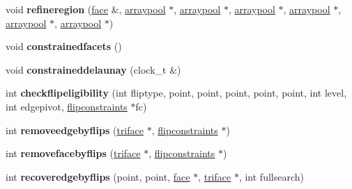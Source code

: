 \begin{DoxyCompactItemize}
\item 
\mbox{\label{classtetgenmesh_aa34a5188a4cee82197394560c388c348}} 
void {\bfseries refineregion} (\hyperlink{classtetgenmesh_1_1face}{face} \&, \hyperlink{classtetgenmesh_1_1arraypool}{arraypool} $\ast$, \hyperlink{classtetgenmesh_1_1arraypool}{arraypool} $\ast$, \hyperlink{classtetgenmesh_1_1arraypool}{arraypool} $\ast$, \hyperlink{classtetgenmesh_1_1arraypool}{arraypool} $\ast$, \hyperlink{classtetgenmesh_1_1arraypool}{arraypool} $\ast$, \hyperlink{classtetgenmesh_1_1arraypool}{arraypool} $\ast$)
\item 
\mbox{\label{classtetgenmesh_a7579c3a44a54712623d9f9e5fc1dfbdc}} 
void {\bfseries constrainedfacets} ()
\item 
\mbox{\label{classtetgenmesh_aab64d62b3d2b048a38158fb2bf678624}} 
void {\bfseries constraineddelaunay} (clock\+\_\+t \&)
\item 
\mbox{\label{classtetgenmesh_afa19bcc54b58a65b05bf43cceaec68ec}} 
int {\bfseries checkflipeligibility} (int fliptype, point, point, point, point, point, int level, int edgepivot, \hyperlink{classtetgenmesh_1_1flipconstraints}{flipconstraints} $\ast$fc)
\item 
\mbox{\label{classtetgenmesh_aa3b3b69fbbdda1fcce103640425f9694}} 
int {\bfseries removeedgebyflips} (\hyperlink{classtetgenmesh_1_1triface}{triface} $\ast$, \hyperlink{classtetgenmesh_1_1flipconstraints}{flipconstraints} $\ast$)
\item 
\mbox{\label{classtetgenmesh_a74795dd220990bdcf206cdc6686ab336}} 
int {\bfseries removefacebyflips} (\hyperlink{classtetgenmesh_1_1triface}{triface} $\ast$, \hyperlink{classtetgenmesh_1_1flipconstraints}{flipconstraints} $\ast$)
\item 
\mbox{\label{classtetgenmesh_a3f37237d1ab2a95593e2e9ef55929373}} 
int {\bfseries recoveredgebyflips} (point, point, \hyperlink{classtetgenmesh_1_1face}{face} $\ast$, \hyperlink{classtetgenmesh_1_1triface}{triface} $\ast$, int fullsearch)
\item 
\mbox{\label{classtetgenmesh_acb5fc751eaa4a4ddffbebedfa7b7382a}} 

\end{DoxyCompactItemize}
